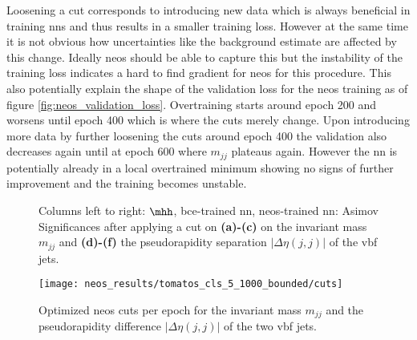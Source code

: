 Loosening a cut corresponds to introducing new data which is always beneficial in training \acp{nn} and thus results in a smaller training loss. However at the same time it is not obvious how uncertainties like the background estimate are affected by this change. Ideally \ac{neos} should be able to capture this but the instability of the training loss indicates a hard to find gradient for \ac{neos} for this procedure. This also potentially explain the shape of the validation loss for the \ac{neos} training as of figure \ref{fig:neos_validation_loss}. Overtraining starts around epoch 200 and worsens until epoch 400 which is where the cuts merely change. Upon introducing more data by further loosening the cuts around epoch 400 the validation also decreases again until at epoch 600 where $m_{jj}$ plateaus again. However the \ac{nn} is potentially already in a local overtrained minimum showing no signs of further improvement and the training becomes unstable. 


\begin{figure}
    \centering
    \caption[]{Columns left to right: $\mhh$, \ac{bce}-trained \ac{nn}, \ac{neos}-trained \ac{nn}: Asimov Significances after applying a cut on \textbf{(a)-(c)} on the invariant mass $m_{jj}$ and \textbf{(d)-(f)} the pseudorapidity separation $|\Delta\eta(j,j)|$ of the \ac{vbf} jets. }
    \label{fig:cut_scan}
\end{figure}

\begin{figure}
    \centering
    \texttt{[image: neos\_results/tomatos\_cls\_5\_1000\_bounded/cuts]}
    \caption[]{Optimized \ac{neos} cuts per epoch for the invariant mass $m_{jj}$ and the pseudorapidity difference $|\Delta\eta(j,j)|$ of the two \ac{vbf} jets.}
    \label{fig:neos_cuts}
\end{figure}

